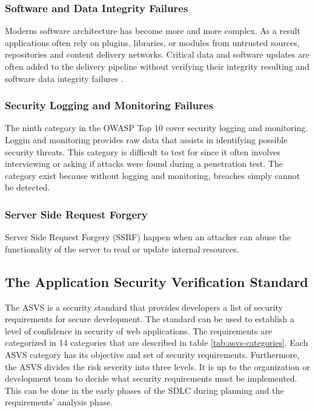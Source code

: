 \subsubsection{Software and Data Integrity Failures}
Moderns software architecture has become more and more complex. As a result applications often rely on plugins, libraries, or modules from untrusted sources, repositories and content delivery networks. Critical data and software updates are often added to the delivery pipeline without verifying their integrity resulting and software data integrity failures \cite{site:A08_2022}.

\subsubsection{Security Logging and Monitoring Failures}
The ninth category in the OWASP Top 10 cover security logging and monitoring. Loggin and monitoring provides raw data that assists in identifying possible security threats. This category is difficult to test for since it often involves interviewing or asking if attacks were found during a penetration test. The category exist because without logging and monitoring, breaches simply cannot be detected.

\subsubsection{Server Side Request Forgery}
Server Side Request Forgery (SSRF) happen when an attacker can abuse the functionality of the server to read or update internal resources.

\subsection{The Application Security Verification Standard}
The ASVS is a security standard that provides developers a list of security requirements for secure development. The standard can be used to establish a level of confidence in security of web applications. The requirements are categorized in 14 categories that are described in table \ref{tab:asvs-categories}. Each ASVS category has its objective and set of security requirements. Furthermore, the ASVS divides the risk severity into three levels. It is up to the organization or development team to decide what security requirements must be implemented. This can be done in the early phases of the SDLC during planning and the requirements' analysis phase.

